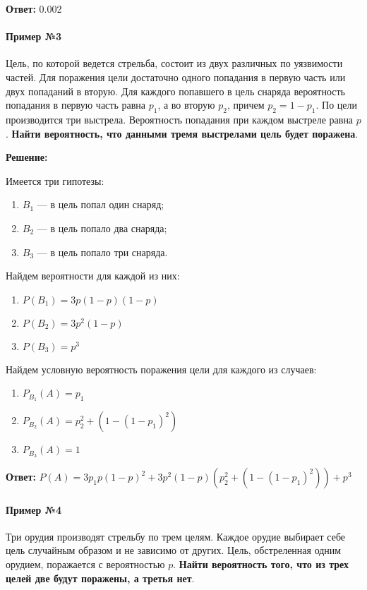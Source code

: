 \documentclass{article}
\begin{document}
\textbf{Ответ:} 0.002

\paragraph{Пример №3} Цель, по которой ведется стрельба, состоит из двух различных по уязвимости частей. Для поражения цели достаточно одного попадания в первую часть или двух попаданий в вторую. Для каждого попавшего в цель снаряда вероятность попадания в первую часть равна $p_1$, а во вторую $p_2$, причем $p_2 = 1 - p_1$. По цели производится три выстрела. Вероятность попадания при каждом выстреле равна $p$. \textbf{Найти вероятность, что данными тремя выстрелами цель будет поражена}.

\textbf{Решение:}

Имеется три гипотезы:

\begin{enumerate}
    \item $B_1$ — в цель попал один снаряд;
    \item $B_2$ — в цель попало два снаряда;
    \item $B_3$ — в цель попало три снаряда.
\end{enumerate}

Найдем вероятности для каждой из них:

\begin{enumerate}
    \item $P(B_1) = 3 p (1 - p)(1 - p)$
    \item $P(B_2) = 3 p^2 (1 - p)$
    \item $P(B_3) = p^3$
\end{enumerate}

Найдем условную вероятность поражения цели для каждого из случаев:

\begin{enumerate}
    \item $P_{B_1}(A) = p_1$
    \item $P_{B_2}(A) = p_2^2 + (1 - (1 - p_1)^2)$
    \item $P_{B_3}(A) = 1$
\end{enumerate}

\textbf{Ответ:} $P(A) = 3p_1p (1-p)^2 + 3p^2 (1 - p) (p_2^2 + (1 - (1 - p_1)^2)) + p^3$

\paragraph{Пример №4}

Три орудия производят стрельбу по трем целям. Каждое орудие выбирает себе цель случайным образом и не зависимо от других. Цель, обстреленная одним орудием, поражается с вероятностью $p$. \textbf{Найти вероятность того, что из трех целей две будут поражены, а третья нет}.
\end{document}
